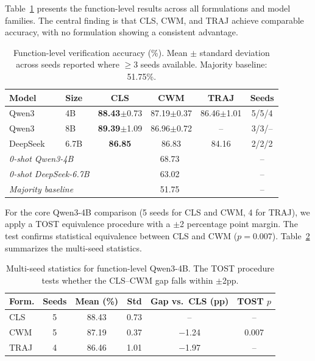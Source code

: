 \documentclass[11pt,a4paper]{article}
\begin{document}
Table~\ref{tab:func} presents the function-level results across all formulations and model families. The central finding is that CLS, CWM, and TRAJ achieve comparable accuracy, with no formulation showing a consistent advantage.

\begin{table}[t]
\centering
\caption{Function-level verification accuracy (\%). Mean $\pm$ standard deviation across seeds reported where $\geq$3 seeds available. Majority baseline: 51.75\%.}
\label{tab:func}
\small
\begin{tabular}{llcccc}
\toprule
Model & Size & CLS & CWM & TRAJ & Seeds \\
\midrule
Qwen3 & 4B & \textbf{88.43}{\scriptsize$\pm$0.73} & 87.19{\scriptsize$\pm$0.37} & 86.46{\scriptsize$\pm$1.01} & 5/5/4 \\
Qwen3 & 8B & \textbf{89.39}{\scriptsize$\pm$1.09} & 86.96{\scriptsize$\pm$0.72} & -- & 3/3/-- \\
DeepSeek & 6.7B & \textbf{86.85} & 86.83 & 84.16 & 2/2/2 \\
\midrule
\multicolumn{2}{l}{\textit{0-shot Qwen3-4B}} & \multicolumn{3}{c}{68.73} & -- \\
\multicolumn{2}{l}{\textit{0-shot DeepSeek-6.7B}} & \multicolumn{3}{c}{63.02} & -- \\
\multicolumn{2}{l}{\textit{Majority baseline}} & \multicolumn{3}{c}{51.75} & -- \\
\bottomrule
\end{tabular}
\end{table}

For the core Qwen3-4B comparison (5 seeds for CLS and CWM, 4 for TRAJ), we apply a TOST equivalence procedure with a $\pm$2 percentage point margin. The test confirms statistical equivalence between CLS and CWM ($p{=}0.007$). Table~\ref{tab:seeds} summarizes the multi-seed statistics.

\begin{table}[t]
\centering
\caption{Multi-seed statistics for function-level Qwen3-4B. The TOST procedure tests whether the CLS--CWM gap falls within $\pm$2pp.}
\label{tab:seeds}
\small
\begin{tabular}{lccccc}
\toprule
Form. & Seeds & Mean (\%) & Std & Gap vs.\ CLS (pp) & TOST $p$ \\
\midrule
CLS & 5 & 88.43 & 0.73 & -- & -- \\
CWM & 5 & 87.19 & 0.37 & $-$1.24 & 0.007 \\
TRAJ & 4 & 86.46 & 1.01 & $-$1.97 & -- \\
\bottomrule
\end{tabular}
\end{table}
\end{document}
